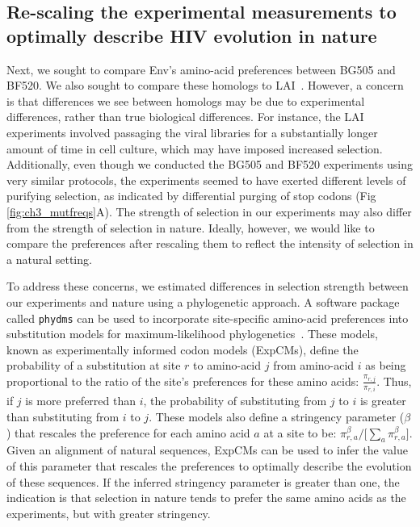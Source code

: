 \documentclass[9pt]{elife}
\begin{document}
\subsection*{Re-scaling the experimental measurements to optimally describe HIV evolution in nature}
Next, we sought to compare Env's amino-acid preferences between BG505 and BF520.
We also sought to compare these homologs to LAI~\cite{haddox2016experimental}.
However, a concern is that differences we see between homologs may be due to experimental differences, rather than true biological differences.
For instance, the LAI experiments involved passaging the viral libraries for a substantially longer amount of time in cell culture, which may have imposed increased selection.
Additionally, even though we conducted the BG505 and BF520 experiments using very similar protocols, the experiments seemed to have exerted different levels of purifying selection, as indicated by differential purging of stop codons (Fig \ref{fig:ch3_mutfreqs}A).
The strength of selection in our experiments may also differ from the strength of selection in nature.
Ideally, however, we would like to compare the preferences after rescaling them to reflect the intensity of selection in a natural setting.

To address these concerns, we estimated differences in selection strength between our experiments and nature using a phylogenetic approach.
A software package called \texttt{phydms} can be used to incorporate site-specific amino-acid preferences into substitution models for maximum-likelihood phylogenetics~\cite{hilton2017phydms}.
These models, known as experimentally informed codon models (ExpCMs), define the probability of a substitution at site $r$ to amino-acid $j$ from amino-acid $i$ as being proportional to the ratio of the site's preferences for these amino acids: $\frac{\pi_{r,j}}{\pi_{r,i}}$.
Thus, if $j$ is more preferred than $i$, the probability of substituting from $j$ to $i$ is greater than substituting from $i$ to $j$.
These models also define a stringency parameter ($\beta$) that rescales the preference for each amino acid $a$ at a site to be: $\pi_{r,a}^{\beta} / \lbrack \sum_{a} \pi_{r,a}^{\beta} \rbrack$.
Given an alignment of natural sequences, ExpCMs can be used to infer the value of this parameter that rescales the preferences to optimally describe the evolution of these sequences.
If the inferred stringency parameter is greater than one, the indication is that selection in nature tends to prefer the same amino acids as the experiments, but with greater stringency.
\end{document}
